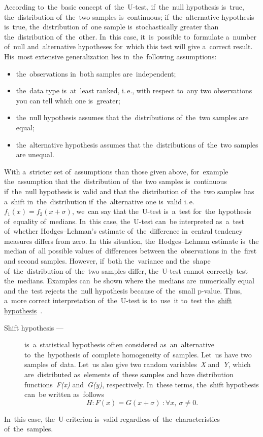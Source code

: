 \documentclass[]{scrreprt}
\begin{document}
According to~the~basic concept of~the~U-test, if~the~null hypothesis is~true, the~distribution of~the~two samples is~continuous; if~the~alternative hypothesis is~true, the~distribution of~one sample is~stochastically greater than the~distribution of~the~other. In~this case, it~is~possible to~formulate a~number of~null and~alternative hypotheses for~which this test will give a~correct result. His~most extensive generalization lies in~the~following assumptions:
\begin{itemize}
	\item the~observations in~both samples are~independent;
	\item the~data type is~at~least ranked, i.\,e., with respect to~any two observations you can tell which one is~greater;
	\item the~null hypothesis assumes that the~distributions of~the~two samples are equal;
	\item the~alternative hypothesis assumes that the~distributions of~the~two samples are unequal.
\end{itemize}
With a~stricter set of~assumptions than those given above, for~example the~assumption that the~distribution of~the~two samples is~continuous if~the~null hypothesis is~valid and that the~distribution of~the~two samples has a~shift  in~the~distribution if~the~alternative one is~valid i.\,e.~$f_{1}(x)=f_{2}(x+\sigma)$,  we~can say that the~U-test is~a~test for~the~hypothesis of~equality of~medians. In~this case, the~U-test can~be interpreted as~a~test of~whether Hodges--Lehman's estimate of~the~difference in~central tendency measures differs from zero. In~this situation, the~Hodges--Lehman estimate is~the median of~all possible values of~differences between the~observations in~the~first and second samples. However, if~both the~variance and the~shape of~the~distribution of~the~two samples differ, the~U-test cannot correctly test the~medians. Examples can~be shown where the~medians are~numerically equal and the~test rejects the~null hypothesis because of~the~small p-value. Thus, a~more correct interpretation of~the~U-test is~to~use~it to~test the~\href{http://www.machinelearning.ru/wiki/index.php?title=Гипотеза_сдвига}{shift hypothesis}~\cite{MLRU:shift-hypothesis}.
\begin{description}
	\item[Shift hypothesis ---] is~a~statistical hypothesis often considered as~an~alternative to~the~hypothesis of~complete homogeneity of~samples. Let~us have two samples of~data. Let~us also give two random variables~\textit{X} and~\textit{Y}, which are~distributed as~elements of~these samples and have distribution functions~\textit{F(x)} and~\textit{G(y)}, respectively. In~these terms, the~shift hypothesis can~be written as~follows
	\begin{equation}\label{eq:shift-hypothesis}
	H:F(x)=G(x+\sigma)\ : \forall x,\ \sigma \neq 0.
	\end{equation}
\end{description}
In~this case, the~U-criterion is~valid regardless of~the~characteristics of~the~samples.
\end{document}
